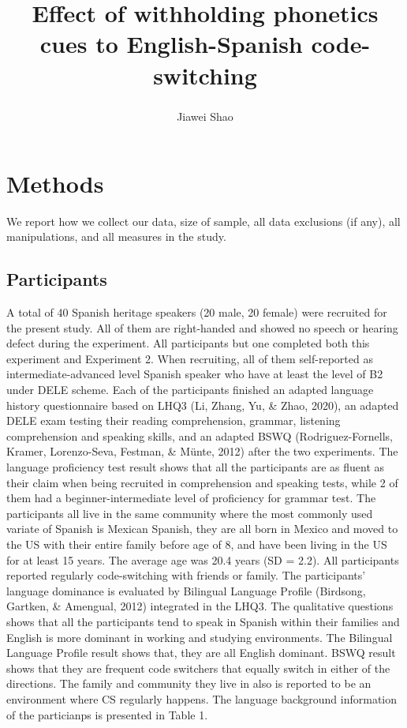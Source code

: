 \documentclass[
  english,
  man,floatsintext]{apa6}
\title{Effect of withholding phonetics cues to English-Spanish code-switching}
\author{Jiawei Shao\textsuperscript{}}
\date{}
\affiliation{\phantom{0}}
\begin{document}
\maketitle

\hypertarget{methods}{%
\section{Methods}\label{methods}}

We report how we collect our data, size of sample, all data exclusions (if any), all manipulations, and all measures in the study.

\hypertarget{participants}{%
\subsection{Participants}\label{participants}}

A total of 40 Spanish heritage speakers (20 male, 20 female) were recruited for the present study. All of them are right-handed and showed no speech or hearing defect during the experiment. All participants but one completed both this experiment and Experiment 2. When recruiting, all of them self-reported as intermediate-advanced level Spanish speaker who have at least the level of B2 under DELE scheme. Each of the participants finished an adapted language history questionnaire based on LHQ3 (Li, Zhang, Yu, \& Zhao, 2020), an adapted DELE exam testing their reading comprehension, grammar, listening comprehension and speaking skills, and an adapted BSWQ (Rodriguez-Fornells, Kramer, Lorenzo-Seva, Festman, \& Münte, 2012) after the two experiments. The language proficiency test result shows that all the participants are as fluent as their claim when being recruited in comprehension and speaking tests, while 2 of them had a beginner-intermediate level of proficiency for grammar test. The participants all live in the same community where the most commonly used variate of Spanish is Mexican Spanish, they are all born in Mexico and moved to the US with their entire family before age of 8, and have been living in the US for at least 15 years. The average age was 20.4 years (SD = 2.2). All participants reported regularly code-switching with friends or family. The participants' language dominance is evaluated by Bilingual Language Profile (Birdsong, Gartken, \& Amengual, 2012) integrated in the LHQ3. The qualitative questions shows that all the participants tend to speak in Spanish within their families and English is more dominant in working and studying environments. The Bilingual Language Profile result shows that, they are all English dominant. BSWQ result shows that they are frequent code switchers that equally switch in either of the directions. The family and community they live in also is reported to be an environment where CS regularly happens. The language background information of the particianps is presented in Table 1.
\end{document}
